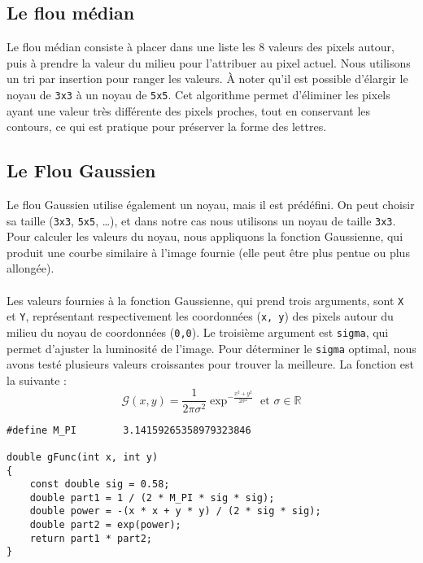 \documentclass{article}
\begin{document}
\subsection{Le flou médian}
Le flou médian consiste à placer dans une liste les 8 valeurs des pixels autour, puis à prendre la valeur du milieu pour l’attribuer au pixel actuel. Nous utilisons un tri par insertion pour ranger les valeurs. À noter qu’il est possible d’élargir le noyau de \texttt{3x3} à un noyau de \texttt{5x5}. Cet algorithme permet d’éliminer les pixels ayant une valeur très différente des pixels proches, tout en conservant les contours, ce qui est pratique pour préserver la forme des lettres.

\subsection{Le Flou Gaussien}
Le flou Gaussien utilise également un noyau, mais il est prédéfini. On peut choisir sa taille (\texttt{3x3}, \texttt{5x5}, …), et dans notre cas nous utilisons un noyau de taille \texttt{3x3}. Pour calculer les valeurs du noyau, nous appliquons la fonction Gaussienne, qui produit une courbe similaire à l'image fournie (elle peut être plus pentue ou plus allongée).
\paragraph{}
Les valeurs fournies à la fonction Gaussienne, qui prend trois arguments, sont \texttt{X} et \texttt{Y}, représentant respectivement les coordonnées (\texttt{x, y}) des pixels autour du milieu du noyau de coordonnées (\texttt{0,0}). Le troisième argument est \texttt{sigma}, qui permet d'ajuster la luminosité de l’image. Pour déterminer le \texttt{sigma} optimal, nous avons testé plusieurs valeurs croissantes pour trouver la meilleure. La fonction est la suivante :
$$
\mathcal{G}(x,y) = \frac{1}{2\pi\sigma^2}\exp^{-\frac{x^2+y^2}{2\sigma^2}} \mbox{~et~} \sigma \in \mathbb{R}
$$
\begin{lstlisting}
#define M_PI        3.14159265358979323846

double gFunc(int x, int y) 
{
    const double sig = 0.58;
    double part1 = 1 / (2 * M_PI * sig * sig);
    double power = -(x * x + y * y) / (2 * sig * sig);
    double part2 = exp(power);
    return part1 * part2;
}
\end{lstlisting}
\end{document}

